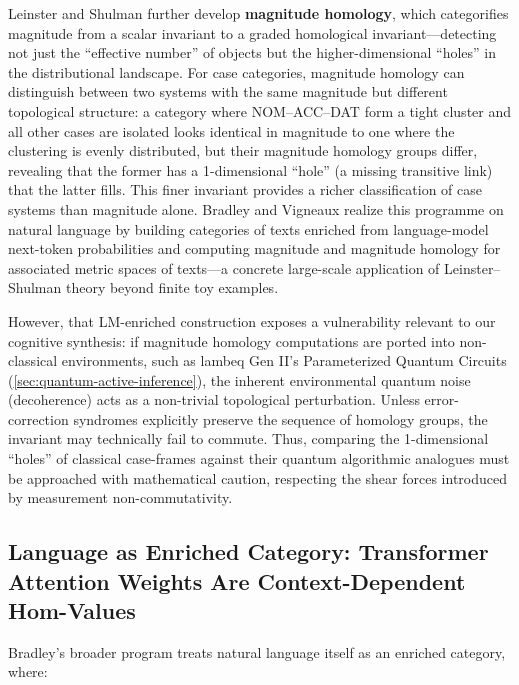 \documentclass[
]{article}
\begin{document}
Leinster and Shulman \citeyearpar{leinster2021magnitude} further develop
\textbf{magnitude homology}, which categorifies magnitude from a scalar
invariant to a graded homological invariant---detecting not just the
``effective number'' of objects but the higher-dimensional ``holes'' in
the distributional landscape. For case categories, magnitude homology
can distinguish between two systems with the same magnitude but
different topological structure: a category where NOM--ACC--DAT form a
tight cluster and all other cases are isolated looks identical in
magnitude to one where the clustering is evenly distributed, but their
magnitude homology groups differ, revealing that the former has a
1-dimensional ``hole'' (a missing transitive link) that the latter
fills. This finer invariant provides a richer classification of case
systems than magnitude alone. Bradley and Vigneaux
\citeyearpar{bradleyvigneaux2025magnitude} realize this programme on
natural language by building categories of texts enriched from
language-model next-token probabilities and computing magnitude and
magnitude homology for associated metric spaces of texts---a concrete
large-scale application of Leinster--Shulman theory beyond finite toy
examples.

However, that LM-enriched construction exposes a vulnerability relevant
to our cognitive synthesis: if magnitude homology computations are
ported into non-classical environments, such as lambeq Gen II's
Parameterized Quantum Circuits (\autoref{sec:quantum-active-inference}),
the inherent environmental quantum noise (decoherence) acts as a
non-trivial topological perturbation. Unless error-correction syndromes
explicitly preserve the sequence of homology groups, the invariant may
technically fail to commute. Thus, comparing the 1-dimensional ``holes''
of classical case-frames against their quantum algorithmic analogues
must be approached with mathematical caution, respecting the shear
forces introduced by measurement non-commutativity.

\subsection{Language as Enriched Category: Transformer Attention Weights
Are Context-Dependent
Hom-Values}\label{language-as-enriched-category-transformer-attention-weights-are-context-dependent-hom-values}

Bradley's
\citetext{\citeyear{bradley2024ipam}; \citeyear{bradley2025tea}} broader
program treats natural language itself as an enriched category, where:
\end{document}
